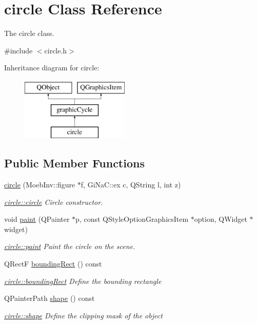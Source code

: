 \hypertarget{classcircle}{}\section{circle Class Reference}
\label{classcircle}


The circle class.  




{\ttfamily \#include $<$circle.\+h$>$}

Inheritance diagram for circle\+:\begin{figure}[H]
\begin{center}
\leavevmode
\includegraphics[height=3.000000cm]{classcircle}
\end{center}
\end{figure}
\subsection*{Public Member Functions}
\begin{DoxyCompactItemize}
\item 
\mbox{\hyperlink{classcircle_af208b2a919d4d4bb7a568fc4228d6a1d}{circle}} (Moeb\+Inv\+::figure $\ast$f, Gi\+Na\+C\+::ex c, Q\+String l, int z)
\begin{DoxyCompactList}\small\item\em \mbox{\hyperlink{classcircle_af208b2a919d4d4bb7a568fc4228d6a1d}{circle\+::circle}} Circle constructor. \end{DoxyCompactList}\item 
void \mbox{\hyperlink{classcircle_af1bdbb1e1ef3f18c1eeda5a24ea13ead}{paint}} (Q\+Painter $\ast$p, const Q\+Style\+Option\+Graphics\+Item $\ast$option, Q\+Widget $\ast$widget)
\begin{DoxyCompactList}\small\item\em \mbox{\hyperlink{classcircle_af1bdbb1e1ef3f18c1eeda5a24ea13ead}{circle\+::paint}} Paint the circle on the scene. \end{DoxyCompactList}\item 
Q\+RectF \mbox{\hyperlink{classcircle_ab9d2059829ac8f0420c7e711caeb61c7}{bounding\+Rect}} () const
\begin{DoxyCompactList}\small\item\em \mbox{\hyperlink{classcircle_ab9d2059829ac8f0420c7e711caeb61c7}{circle\+::bounding\+Rect}} Define the bounding rectangle \end{DoxyCompactList}\item 
Q\+Painter\+Path \mbox{\hyperlink{classcircle_a198cbcea745bd311fe91c2a23def746c}{shape}} () const
\begin{DoxyCompactList}\small\item\em \mbox{\hyperlink{classcircle_a198cbcea745bd311fe91c2a23def746c}{circle\+::shape}} Define the clipping mask of the object \end{DoxyCompactList}\end{DoxyCompactItemize}
